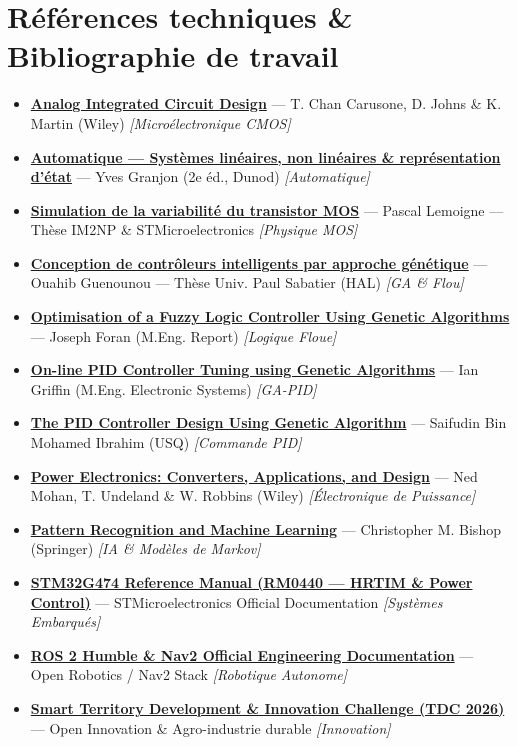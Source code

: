 \documentclass[10pt,a4paper]{article}
\begin{document}
\section*{Références techniques \& Bibliographie de travail}
\begin{itemize}
\item \href{https://www.wiley.com/en-us/Analog+Integrated+Circuit+Design\%2C+2nd+Edition-p-9780470770108}{\textbf{Analog Integrated Circuit Design}} --- T. Chan Carusone, D. Johns \& K. Martin (Wiley) \textit{[Microélectronique CMOS]}
\item \href{https://www.dunod.com/}{\textbf{Automatique --- Systèmes linéaires, non linéaires \& représentation d'état}} --- Yves Granjon (2e éd., Dunod) \textit{[Automatique]}
\item \href{https://www.im2np.fr/}{\textbf{Simulation de la variabilité du transistor MOS}} --- Pascal Lemoigne --- Thèse IM2NP \& STMicroelectronics \textit{[Physique MOS]}
\item \href{https://theses.hal.science/tel-00392473v1}{\textbf{Conception de contrôleurs intelligents par approche génétique}} --- Ouahib Guenounou --- Thèse Univ. Paul Sabatier (HAL) \textit{[GA \& Flou]}
\item \href{https://www.mathworks.com/products/fuzzy-logic.html}{\textbf{Optimisation of a Fuzzy Logic Controller Using Genetic Algorithms}} --- Joseph Foran (M.Eng. Report) \textit{[Logique Floue]}
\item \href{https://www.mathworks.com/discovery/genetic-algorithm.html}{\textbf{On-line PID Controller Tuning using Genetic Algorithms}} --- Ian Griffin (M.Eng. Electronic Systems) \textit{[GA-PID]}
\item \href{https://www.mathworks.com/discovery/pid-control.html}{\textbf{The PID Controller Design Using Genetic Algorithm}} --- Saifudin Bin Mohamed Ibrahim (USQ) \textit{[Commande PID]}
\item \href{https://www.wiley.com/}{\textbf{Power Electronics: Converters, Applications, and Design}} --- Ned Mohan, T. Undeland \& W. Robbins (Wiley) \textit{[Électronique de Puissance]}
\item \href{https://www.microsoft.com/en-us/research/publication/pattern-recognition-machine-learning/}{\textbf{Pattern Recognition and Machine Learning}} --- Christopher M. Bishop (Springer) \textit{[IA \& Modèles de Markov]}
\item \href{https://www.st.com/resource/en/reference_manual/rm0440-stm32g4-series-advanced-armbased-32bit-mcus-stmicroelectronics.pdf}{\textbf{STM32G474 Reference Manual (RM0440 --- HRTIM \& Power Control)}} --- STMicroelectronics Official Documentation \textit{[Systèmes Embarqués]}
\item \href{https://navigation.ros.org/}{\textbf{ROS 2 Humble \& Nav2 Official Engineering Documentation}} --- Open Robotics / Nav2 Stack \textit{[Robotique Autonome]}
\item \href{https://ensat.ac.ma/Portail/}{\textbf{Smart Territory Development \& Innovation Challenge (TDC 2026)}} --- Open Innovation \& Agro-industrie durable \textit{[Innovation]}
\end{itemize}
\end{document}
